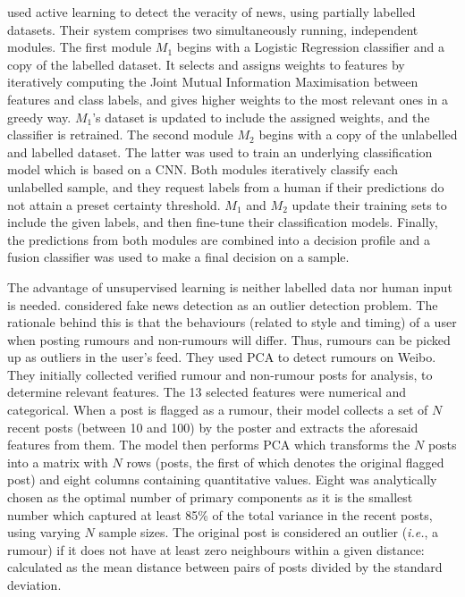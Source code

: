  used active learning to detect the veracity of news, using partially labelled datasets. Their system comprises two simultaneously running, independent modules. The first module $M_1$ begins with a Logistic Regression classifier and a copy of the labelled dataset. It selects and assigns weights to features by iteratively computing the Joint Mutual Information Maximisation between features and class labels, and gives higher weights to the most relevant ones in a greedy way. $M_1$’s dataset is updated to include the assigned weights, and the classifier is retrained. The second module $M_2$ begins with a copy of the unlabelled and labelled dataset. The latter was used to train an underlying classification model which is based on a \ac{CNN}. Both modules iteratively classify each unlabelled sample, and they request labels from a human if their predictions do not attain a preset certainty threshold. $M_1$ and $M_2$ update their training sets to include the given labels, and then fine-tune their classification models. Finally, the predictions from both modules are combined into a decision profile and a fusion classifier was used to make a final decision on a sample.

The advantage of unsupervised learning is neither labelled data nor human input is needed.  considered fake news detection as an outlier detection problem. The rationale behind this is that the behaviours (related to style and timing) of a user when posting rumours and non-rumours will differ. Thus, rumours can be picked up as outliers in the user’s feed. They used \ac{PCA} to detect rumours on Weibo. They initially collected verified rumour and non-rumour posts for analysis, to determine relevant features. The 13 selected features were numerical and categorical. When a post is flagged as a rumour, their model collects a set of $N$ recent posts (between 10 and 100) by the poster and extracts the aforesaid features from them.
The model then performs \ac{PCA} which transforms the $N$ posts into a matrix with $N$ rows (posts, the first of which denotes the original flagged post) and eight columns containing quantitative values. Eight was analytically chosen as the optimal number of primary components as it is the smallest number which captured at least 85\% of the total variance in the recent posts, using varying $N$ sample sizes. The original post is considered an outlier (\emph{i.e.}, a rumour) if it does not have at least zero neighbours within a given distance: calculated as the mean distance between pairs of posts divided by the standard deviation.


